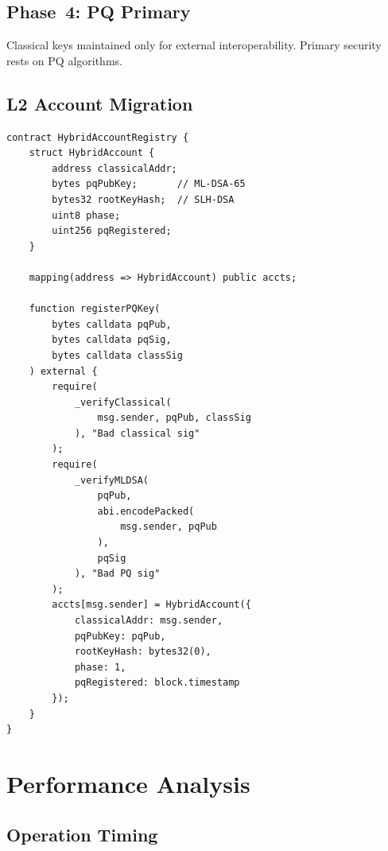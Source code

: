 \documentclass[11pt,a4paper]{article}
\begin{document}
\subsection{Phase~4: PQ Primary}

Classical keys maintained only for external interoperability.  Primary
security rests on PQ algorithms.

\subsection{L2 Account Migration}

\begin{lstlisting}[language=Solidity,caption={Hybrid Account Registry}]
contract HybridAccountRegistry {
    struct HybridAccount {
        address classicalAddr;
        bytes pqPubKey;       // ML-DSA-65
        bytes32 rootKeyHash;  // SLH-DSA
        uint8 phase;
        uint256 pqRegistered;
    }

    mapping(address => HybridAccount) public accts;

    function registerPQKey(
        bytes calldata pqPub,
        bytes calldata pqSig,
        bytes calldata classSig
    ) external {
        require(
            _verifyClassical(
                msg.sender, pqPub, classSig
            ), "Bad classical sig"
        );
        require(
            _verifyMLDSA(
                pqPub,
                abi.encodePacked(
                    msg.sender, pqPub
                ),
                pqSig
            ), "Bad PQ sig"
        );
        accts[msg.sender] = HybridAccount({
            classicalAddr: msg.sender,
            pqPubKey: pqPub,
            rootKeyHash: bytes32(0),
            phase: 1,
            pqRegistered: block.timestamp
        });
    }
}
\end{lstlisting}

\section{Performance Analysis}
\label{sec:performance}

\subsection{Operation Timing}
\end{document}
